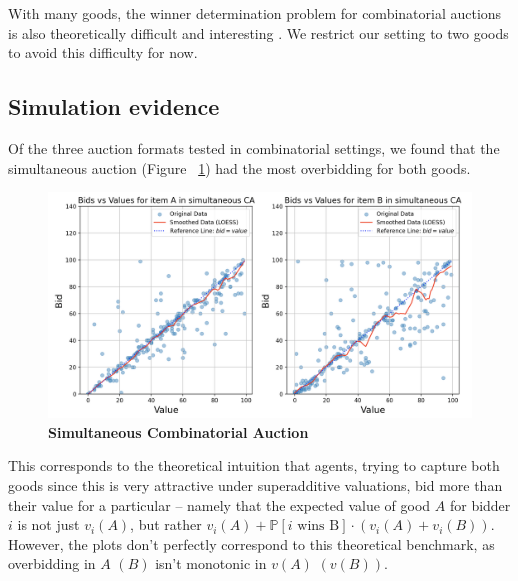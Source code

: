 \documentclass{article} %
\begin{document}
With many goods, the winner determination problem for combinatorial auctions is also theoretically difficult and interesting \cite{lehmann2006winner}. 
We restrict our setting to two goods to avoid this difficulty for now.

\subsection{Simulation evidence}
Of the three auction formats tested in combinatorial settings, we found that the simultaneous auction (Figure ~\ref{fig:simu}) had the most overbidding for both goods. 

\begin{figure}[h!]
    \centering \includegraphics[width=\linewidth]{Figs/Simultaneous.png}
    \caption{\textbf{Simultaneous Combinatorial Auction} }
    \label{fig:simu}
\end{figure}

This corresponds to the theoretical intuition that agents, trying to capture both goods since this is very attractive under superadditive valuations, bid more than their value for a particular -- namely that the expected value of good $A$ for bidder $i$ is not just $v_i(A)$, but rather $v_i(A) + \mathbb{P}[\text{$i$ wins B}]\cdot(v_i(A) + v_i(B))$. 
However, the plots don't perfectly correspond to this theoretical benchmark, as overbidding in $A$ $(B)$ isn't monotonic in $v(A)$ $(v(B))$.
\end{document}
